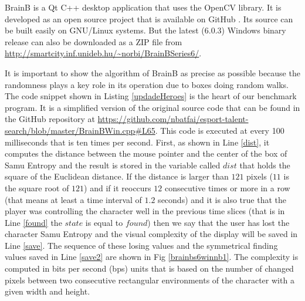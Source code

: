 BrainB is a Qt C++ desktop application that uses the OpenCV library. It is developed as an open source project 
that is available on GitHub \cite{brainbsw}. Its source can be built easily on GNU/Linux systems. But the latest (6.0.3) Windows binary release can also be downloaded as a ZIP file from \url{http://smartcity.inf.unideb.hu/~norbi/BrainBSeries6/}.


It is important to show the algorithm of BrainB  as precise as possible because the randomness plays a key role in its operation due to boxes doing random walks.
The code snippet shown in Listing \ref{updadeHeroes} is the heart of our benchmark program. 
It is a simplified version of the original source code that can be found in the GitHub repository at  \url{https://github.com/nbatfai/esport-talent-search/blob/master/BrainBWin.cpp#L65}.
This code is executed at every 100 milliseconds that is ten times per second. 
First, as shown in Line \ref{dist}, it computes the distance between the mouse pointer and the center of the box of Samu Entropy and the result is stored in the variable called $dist$ that holds the square of the Euclidean distance. If the distance is larger than $121$ pixels ($11$ is the square root of $121$) and 
if it reoccurs $12$ consecutive times or more in a row (that means at least a time interval of $1.2$ seconds) 
and it is also true that the player was controlling the character well in the previous time slices 
(that is in Line \ref{found} the $state$ is equal to $found$)
then we say that the user has lost the character Samu Entropy and the visual complexity of the display will be saved in Line \ref{save}. The sequence of these losing values and the symmetrical finding values saved in Line \ref{save2} are shown in Fig \ref{brainbs6winnb1}. The complexity is computed in bits per second (bps) units that is based on the number of changed pixels between two consecutive rectangular environments of the character with a given width and height.




